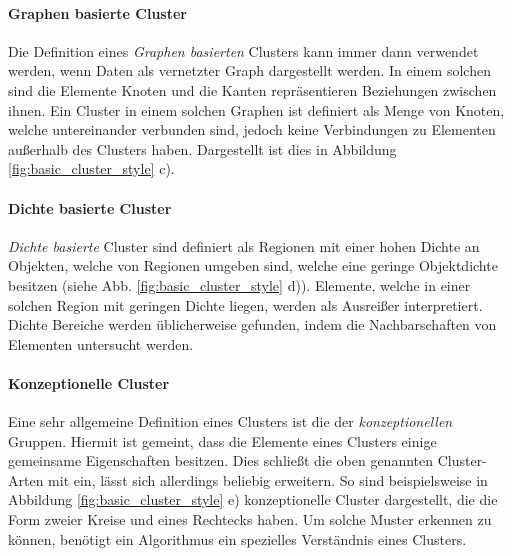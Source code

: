 \paragraph{Graphen basierte Cluster}
Die Definition eines \textit{Graphen basierten} Clusters kann immer dann verwendet werden, wenn Daten
als vernetzter Graph dargestellt werden. In einem solchen sind die Elemente Knoten und die Kanten
repräsentieren Beziehungen zwischen ihnen. Ein Cluster in einem solchen Graphen ist definiert als Menge von
Knoten, welche untereinander verbunden sind, jedoch keine Verbindungen zu Elementen außerhalb des Clusters haben.
Dargestellt ist dies in Abbildung \ref{fig:basic_cluster_style} c).

\paragraph{Dichte basierte Cluster}
\textit{Dichte basierte} Cluster sind definiert als Regionen mit einer hohen Dichte an Objekten, welche von
Regionen umgeben sind, welche eine geringe Objektdichte besitzen (siehe Abb. \ref{fig:basic_cluster_style} d)). Elemente, welche in einer solchen Region
mit geringen Dichte liegen, werden als Ausreißer interpretiert. Dichte Bereiche werden üblicherweise
gefunden, indem die Nachbarschaften von Elementen untersucht werden.

\paragraph{Konzeptionelle Cluster}
Eine sehr allgemeine Definition eines Clusters ist die der \textit{konzeptionellen} Gruppen. Hiermit ist
gemeint, dass die Elemente eines Clusters einige gemeinsame Eigenschaften besitzen. Dies schließt die oben genannten
Cluster-Arten mit ein, lässt sich allerdings beliebig erweitern. So sind beispielsweise in Abbildung \ref{fig:basic_cluster_style} e)
konzeptionelle Cluster dargestellt, die die Form zweier Kreise und eines Rechtecks haben. Um solche Muster
erkennen zu können, benötigt ein Algorithmus ein spezielles Verständnis eines Clusters.

